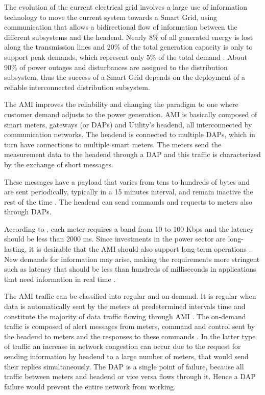 \documentclass[conference]{IEEEtran}
\begin{document}
The evolution of the current electrical grid involves a large use of information technology to move the current system towards a Smart Grid, using communication that allows a bidirectional flow of information between the different subsystems and the headend. Nearly 8\% of all generated energy is lost along the transmission lines and 20\% of the total generation capacity is only to support peak demands, which represent only 5\% of the total demand \cite{Farhangi2010}. About 90\% of power outages and disturbances are assigned to the distribution subsystem, thus the success of a Smart Grid depends on the deployment of a reliable interconnected distribution subsystem. 

The AMI improves the reliability and  changing the paradigm  to one where customer demand adjusts to the power generation. AMI is basically composed of smart meters, gateways (or DAPs) and  Utility's headend, all interconnected by communication networks. 
The headend is connected to multiple DAPs, which in turn have connections to  multiple smart meters.
The meters send the measurement data to the headend through a DAP and this traffic is characterized by the exchange of short messages.  

These messages have a payload that varies from tens to hundreds of bytes and are sent periodically, typically in a 15 minutes interval, and remain inactive the rest of the time \cite{SRS:13,4547164}. The headend can send commands and requests to meters also through DAPs.


According to \cite{Gungor2013}, each meter requires a band from 10 to 100 Kbps and the latency should be less than 2000 ms. Since investments in the power sector are long-lasting, it is desirable that the AMI should also support long-term operations \cite{5484223}. New demands for information may arise, making the requirements more stringent such as latency that should be less than hundreds of milliseconds in applications that need information in real time \cite{Yan2013,5484223}.

The AMI traffic can be classified into regular and on-demand. It is regular when data is automatically sent by the meters at predetermined intervals time \cite{Plan2011,4547164} and constitute the majority of data traffic flowing through AMI \cite{5484223}. The on-demand traffic is composed of alert messages from meters, command and control sent by the headend  to meters and the responses to these commands \cite{Plan2011}. In the latter type of traffic an increase in network congestion can occur due to the request for sending information by headend to a large number of meters, that would send their replies simultaneously. The DAP is a single point of failure, because all traffic between meters and headend or vice versa flows through it. Hence a DAP failure would prevent the entire network from working.
\end{document}
